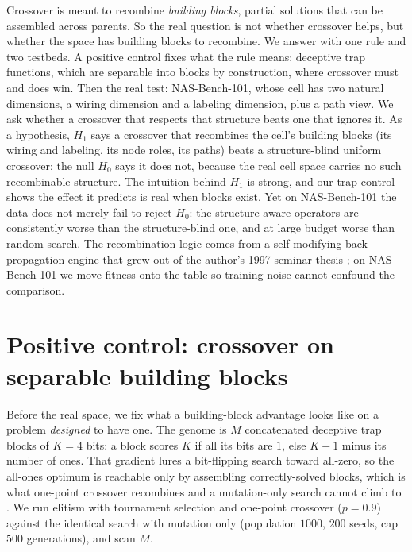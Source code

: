 \documentclass[11pt]{article}
\begin{document}
Crossover \cite{holland1975} is meant to recombine \emph{building blocks}, partial solutions
that can be assembled across parents. So the real question is not whether crossover helps, but
whether the space has building blocks to recombine. We answer with one rule and two testbeds.
A positive control fixes what the rule means: deceptive trap functions, which are separable
into blocks by construction, where crossover must and does win. Then the real test:
NAS-Bench-101, whose cell has two natural dimensions, a wiring dimension and a labeling
dimension, plus a path view. We ask whether a crossover that respects that structure beats one
that ignores it. As a hypothesis, $H_1$ says a crossover that recombines the cell's building
blocks (its wiring and labeling, its node roles, its paths) beats a structure-blind uniform
crossover; the null $H_0$ says it does not, because the real cell space carries no such
recombinable structure. The intuition behind $H_1$ is strong, and our trap control shows the
effect it predicts is real when blocks exist. Yet on NAS-Bench-101 the data does not merely
fail to reject $H_0$: the structure-aware operators are consistently worse than the
structure-blind one, and at large budget worse than random search. The recombination logic
comes from a self-modifying back-propagation engine that grew out of the author's 1997 seminar
thesis \cite{thesis1997}; on NAS-Bench-101 we move fitness onto the table so training noise
cannot confound the comparison.

\section{Positive control: crossover on separable building blocks}

Before the real space, we fix what a building-block advantage looks like on a problem
\emph{designed} to have one. The genome is $M$ concatenated deceptive trap blocks of $K=4$
bits: a block scores $K$ if all its bits are $1$, else $K-1$ minus its number of ones. That
gradient lures a bit-flipping search toward all-zero, so the all-ones optimum is reachable only
by assembling correctly-solved blocks, which is what one-point crossover recombines and a
mutation-only search cannot climb to \cite{deb1993}. We run elitism with tournament selection
and one-point crossover ($p=0.9$) against the identical search with mutation only (population
$1000$, $200$ seeds, cap $500$ generations), and scan $M$.
\end{document}
